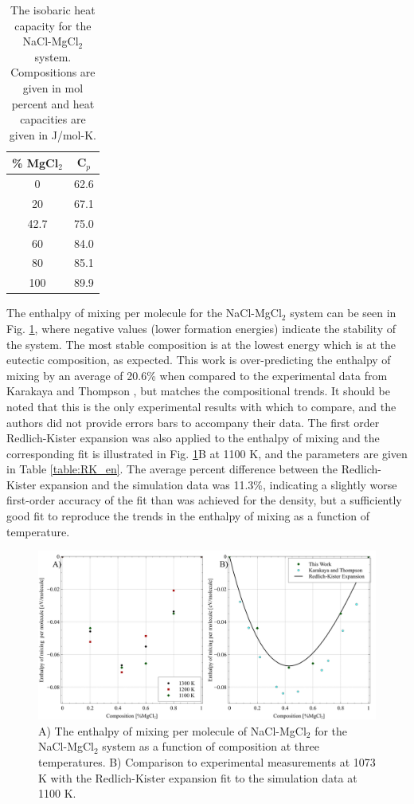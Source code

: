 \documentclass[review]{elsarticle}
\providecommand{\DIFdelbeginFL}{} %
\providecommand{\DIFdelendFL}{} %
\newcommand{\DIFscaledelfig}{0.5}
\newlength{\DIFdelgraphicswidth} %
\newlength{\DIFdelgraphicsheight} %
\newcommand{\DIFdelincludegraphics}[2][]{%
\sbox{\DIFdelgraphicsbox}{\DIFOincludegraphics[#1]{#2}}%
\settoboxwidth{\DIFdelgraphicswidth}{\DIFdelgraphicsbox} %
\settoboxtotalheight{\DIFdelgraphicsheight}{\DIFdelgraphicsbox} %
\scalebox{\DIFscaledelfig}{%
\parbox[b]{\DIFdelgraphicswidth}{\usebox{\DIFdelgraphicsbox}\\[-\baselineskip] \rule{\DIFdelgraphicswidth}{0em}}\llap{\resizebox{\DIFdelgraphicswidth}{\DIFdelgraphicsheight}{%
\setlength{\unitlength}{\DIFdelgraphicswidth}%
\begin{picture}(1,1)%
\thicklines\linethickness{2pt} %
{\color[rgb]{1,0,0}\put(0,0){\framebox(1,1){}}}%
{\color[rgb]{1,0,0}\put(0,0){\line( 1,1){1}}}%
{\color[rgb]{1,0,0}\put(0,1){\line(1,-1){1}}}%
\end{picture}%
}\hspace*{3pt}}} %
} %
\DeclareRobustCommand{\DIFdelbeginFL}{\DIFOdelbeginFL \let\includegraphics\DIFdelincludegraphics} %
\DeclareRobustCommand{\DIFdelendFL}{\DIFOaddendFL \let\includegraphics\DIFOincludegraphics} %
\begin{document}
\begin{table}[h!]
\centering
\caption{The isobaric heat capacity for the NaCl-MgCl$_2$ system. Compositions are given in mol percent and heat capacities are given in J/mol-K.}
\DIFdelbeginFL %

\DIFdelendFL \begin{tabular}{|c|c|}
\hline
\% MgCl$_2$ &  C$_p$\\
\hline
0  &  62.6\\
20 &  67.1  \\
42.7  &  75.0  \\
60 &  84.0  \\
80 &  85.1  \\
100 &  89.9  \\
\hline
\end{tabular}
\label{table:cp}
\end{table}

The enthalpy of mixing per molecule for the NaCl-MgCl$_2$ system can be seen in Fig. \ref{fig:enthalpy}, where negative values (lower formation energies) indicate the stability of the system. The most stable composition is at the lowest energy which is at the eutectic composition, as expected. This work is over-predicting the enthalpy of mixing by an average of 20.6\% when compared to the experimental data from Karakaya and Thompson \cite{karakaya1986thermodynamic}, but matches the compositional trends. It should be noted that this is the only experimental results with which to compare, and the authors did not provide errors bars to accompany their data. The first order Redlich-Kister expansion was also applied to the enthalpy of mixing and the corresponding fit is illustrated in Fig. \ref{fig:enthalpy}B at 1100 K, and the parameters are given in Table \ref{table:RK_en}. The average percent difference between the Redlich-Kister expansion and the simulation data was 11.3\%, indicating a slightly worse first-order accuracy of the fit than was achieved for the density, but a sufficiently good fit to reproduce the trends in the enthalpy of mixing as a function of temperature.

\begin{figure}[h]
 \centering
 \includegraphics[width=1.0\textwidth]{enthalpy.jpg} 
 \caption{A) The enthalpy of mixing per molecule of NaCl-MgCl$_{2}$ for the NaCl-MgCl$_{2}$ system as a function of composition at three temperatures. B) Comparison to experimental measurements at 1073 K \cite{karakaya1986thermodynamic} with the Redlich-Kister expansion fit to the simulation data at 1100 K.}
 \label{fig:enthalpy}
\end{figure} 
\end{document}
